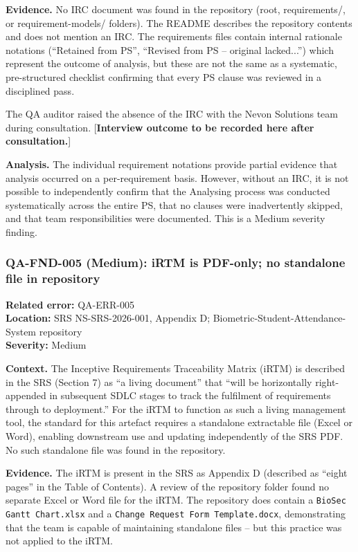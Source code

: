 \documentclass[11pt,a4paper]{article}
\begin{document}
\textbf{Evidence.}
No IRC document was found in the repository (root, requirements/, or requirement-models/ folders). The README describes the repository contents and does not mention an IRC. The requirements files contain internal rationale notations (``Retained from PS'', ``Revised from PS -- original lacked...'') which represent the outcome of analysis, but these are not the same as a systematic, pre-structured checklist confirming that every PS clause was reviewed in a disciplined pass.

The QA auditor raised the absence of the IRC with the Nevon Solutions team during consultation. [\textbf{Interview outcome to be recorded here after consultation.}]

\textbf{Analysis.}
The individual requirement notations provide partial evidence that analysis occurred on a per-requirement basis. However, without an IRC, it is not possible to independently confirm that the Analysing process was conducted systematically across the entire PS, that no clauses were inadvertently skipped, and that team responsibilities were documented. This is a Medium severity finding.

\subsubsection*{QA-FND-005 (Medium): iRTM is PDF-only; no standalone file in repository}

\textbf{Related error:} QA-ERR-005 \\
\textbf{Location:} SRS NS-SRS-2026-001, Appendix D; Biometric-Student-Attendance-System repository \\
\textbf{Severity:} Medium

\textbf{Context.}
The Inceptive Requirements Traceability Matrix (iRTM) is described in the SRS (Section 7) as ``a living document'' that ``will be horizontally right-appended in subsequent SDLC stages to track the fulfilment of requirements through to deployment.'' For the iRTM to function as such a living management tool, the standard for this artefact requires a standalone extractable file (Excel or Word), enabling downstream use and updating independently of the SRS PDF. No such standalone file was found in the repository.

\textbf{Evidence.}
The iRTM is present in the SRS as Appendix D (described as ``eight pages'' in the Table of Contents). A review of the repository folder found no separate Excel or Word file for the iRTM. The repository does contain a \texttt{BioSec Gantt Chart.xlsx} and a \texttt{Change Request Form Template.docx}, demonstrating that the team is capable of maintaining standalone files -- but this practice was not applied to the iRTM.
\end{document}

